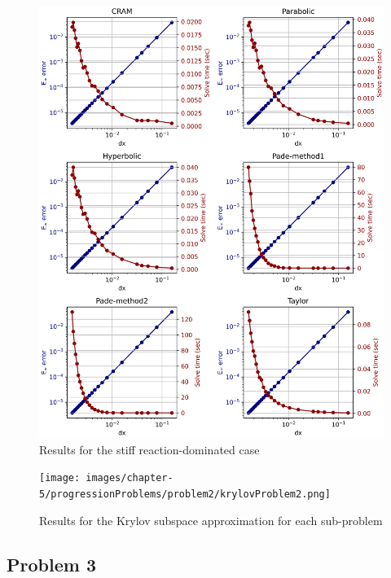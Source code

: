 \begin{figure}[p]
    \centering
    \includegraphics[width=5.0in]{images/chapter-5/progressionProblems/problem2/problem2c.png}
    \caption{Results for the stiff reaction-dominated case}
    \label{fig:problem2_stiff_reaction_dom}
\end{figure}

\clearpage

\begin{landscape}
\thispagestyle{mylandscape}
\begin{figure}[p]
    \centering
    \texttt{[image: images/chapter-5/progressionProblems/problem2/krylovProblem2.png]}
    \caption{Results for the Krylov subspace approximation for each sub-problem}
    \label{fig:problem2_krylov}
\end{figure}
\end{landscape}

\clearpage

\subsection{Problem 3}

